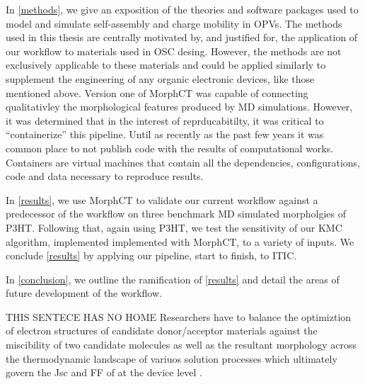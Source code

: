 In \autoref{methods}, we
give an exposition of the theories and software packages used to model and simulate self-assembly and charge mobility in
OPVs.
The methods used in this thesis are centrally motivated by, and justified for, 
the application of our workflow to materials
used in OSC desing. However, the methods are
not exclusively applicable to these materials and could be applied similarly to supplement the engineering of any organic
electronic devices, like those mentioned above. 
Version one of MorphCT was capable of
connecting qualitativley the morphological features produced by MD simulations. However, it was determined
that in the interest of reprducabitilty, it was critical to ``containerize'' this pipeline. Until as recently as
the past few years it was common place to not publish code with the results of computational works. Containers
are virtual machines that contain all the dependencies, configurations, code and data necessary to reproduce
results. \cite{Cito2016a}


In \autoref{results}, we use MorphCT to validate our current workflow against a predecessor of the 
workflow on three benchmark MD simulated morpholgies of P3HT. 
Following that, again using P3HT, we test the sensitivity of our KMC algorithm, implemented
implemented with MorphCT, to a variety of inputs. We conclude \autoref{results} by applying our pipeline,
start to finish, to ITIC. 

In \autoref{conclusion}, we outline the ramification of \autoref{results} and detail the areas of future
development of the workflow. 

THIS SENTECE HAS NO HOME Researchers have to
balance the optimiztion of electron structures of candidate donor/acceptor materials against the miscibility
of two candidate molecules as well as the resultant morphology across the thermodynamic landscape of
variuos solution processes which ultimately govern the Jsc and FF of at the device level \cite{Zhu2020a}. 
